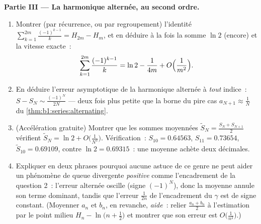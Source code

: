 \begin{problem}[{Devoir maison --- $H_n = \ln n + \gamma +
\frac{1}{2n} + O(n^{-2})$, et le réarrangement de $1 - \frac12 +
\frac13 - \dots$ en $\frac{\ln 2}{2}$}]
\medskip
\noindent\textbf{Partie III --- La  harmonique alternée,
au second ordre.}
\begin{enumerate}[resume]
  \item Montrer (par récurrence, ou par regroupement) l'identité
        $\sum_{k=1}^{2m} \frac{(-1)^{k-1}}{k} = H_{2m} - H_m$,
        et en déduire à la fois la somme $\ln 2$ (encore) et la
        vitesse exacte~:
        \[
        \sum_{k=1}^{2m} \frac{(-1)^{k-1}}{k}
        = \ln 2 - \frac{1}{4m} + O\Bigl(\frac{1}{m^2}\Bigr) .
        \]
  \item En déduire l'erreur asymptotique de la  harmonique
        alternée à \emph{tout} indice~: $S - S_N \sim
        \frac{(-1)^N}{2N}$ --- deux fois plus petite que la borne du
        pire cas $a_{N+1} \approx \frac1N$ du
        \cref{thm:b1:series:alternating}.
  \item (Accélération gratuite) Montrer que les sommes moyennées
        $\tilde S_N = \frac{S_N + S_{N+1}}{2}$ vérifient $\tilde
        S_N = \ln 2 + O\bigl(\frac{1}{N^2}\bigr)$. Vérification~:
        $S_{10} = 0.64563$, $S_{11} = 0.73654$, $\tilde S_{10} =
        0.69109$, contre $\ln 2 = 0.69315$~: une moyenne achète
        deux décimales.
  \item Expliquer en deux phrases pourquoi aucune astuce de ce genre
        ne peut aider un phénomène de queue divergente
        \emph{positive} comme l'encadrement de la question 2~:
        l'erreur alternée oscille (signe $(-1)^N$), donc la moyenne
        annule son terme dominant, tandis que l'erreur
        $\frac{1}{2n}$ de l'encadrement du $\gamma$ est de signe
        constant. (Moyenner $a_n$ et $b_n$, en revanche, \emph{aide}~:
        relier $\frac{a_n + b_n}{2}$ à l'estimation par le point
        milieu $H_n - \ln\bigl(n + \frac12\bigr)$ et montrer que son
        erreur est $O\bigl(\frac{1}{n^2}\bigr)$.)
\end{enumerate}


\end{problem}
